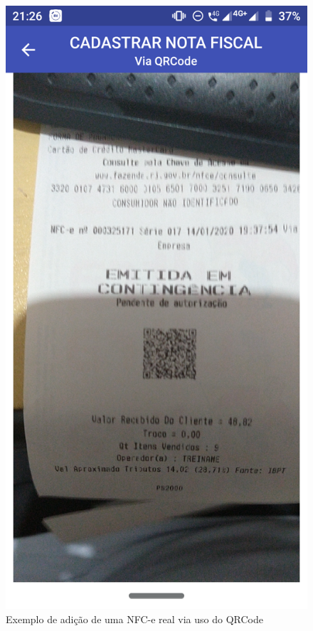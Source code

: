 \begin{figure}[h]
    \centering
    \includegraphics[scale=0.15]{tcc/figures/app/app_qrcode_solicitacao.png}
    \caption{Exemplo de adição de uma NFC-e real via uso do QRCode}
    \label{appQRCodeSolicitacaoFig}
\end{figure}

